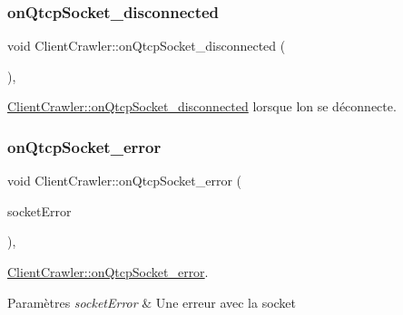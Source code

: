 \subsubsection{\texorpdfstring{on\+Qtcp\+Socket\+\_\+disconnected}{onQtcpSocket\_disconnected}}
{\footnotesize\ttfamily void Client\+Crawler\+::on\+Qtcp\+Socket\+\_\+disconnected (\begin{DoxyParamCaption}{ }\end{DoxyParamCaption})\hspace{0.3cm}{\ttfamily [private]}, {\ttfamily [slot]}}



\hyperlink{class_client_crawler_a48418532d769b7a6826f59aa0bbff7cc}{Client\+Crawler\+::on\+Qtcp\+Socket\+\_\+disconnected} lorsque l\textquotesingle{}on se déconnecte. 

\mbox{\label{class_client_crawler_a88ad5d8a6a1bd7a0b9cfcf4881be46e6}} 
\subsubsection{\texorpdfstring{on\+Qtcp\+Socket\+\_\+error}{onQtcpSocket\_error}}
{\footnotesize\ttfamily void Client\+Crawler\+::on\+Qtcp\+Socket\+\_\+error (\begin{DoxyParamCaption}\item[{Q\+Abstract\+Socket\+::\+Socket\+Error}]{socket\+Error }\end{DoxyParamCaption})\hspace{0.3cm}{\ttfamily [private]}, {\ttfamily [slot]}}



\hyperlink{class_client_crawler_a88ad5d8a6a1bd7a0b9cfcf4881be46e6}{Client\+Crawler\+::on\+Qtcp\+Socket\+\_\+error}. 


\begin{DoxyParams}{Paramètres}
{\em socket\+Error} & Une erreur avec la socket \\
\hline
\end{DoxyParams}
\mbox{\label{class_client_crawler_a7e2e23f7d3b9e8ea84e3fbd3e88a7c56}} 

